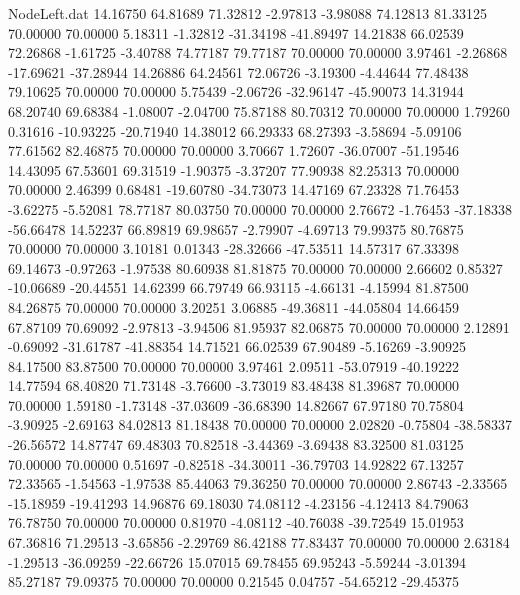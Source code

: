 \begin{filecontents}{NodeLeft.dat}
  14.16750   64.81689   71.32812    -2.97813   -3.98088   74.12813   81.33125   70.00000   70.00000    5.18311   -1.32812  -31.34198  -41.89497
  14.21838   66.02539   72.26868    -1.61725   -3.40788   74.77187   79.77187   70.00000   70.00000    3.97461   -2.26868  -17.69621  -37.28944
  14.26886   64.24561   72.06726    -3.19300   -4.44644   77.48438   79.10625   70.00000   70.00000    5.75439   -2.06726  -32.96147  -45.90073
  14.31944   68.20740   69.68384    -1.08007   -2.04700   75.87188   80.70312   70.00000   70.00000    1.79260    0.31616  -10.93225  -20.71940
  14.38012   66.29333   68.27393    -3.58694   -5.09106   77.61562   82.46875   70.00000   70.00000    3.70667    1.72607  -36.07007  -51.19546
  14.43095   67.53601   69.31519    -1.90375   -3.37207   77.90938   82.25313   70.00000   70.00000    2.46399    0.68481  -19.60780  -34.73073
  14.47169   67.23328   71.76453    -3.62275   -5.52081   78.77187   80.03750   70.00000   70.00000    2.76672   -1.76453  -37.18338  -56.66478
  14.52237   66.89819   69.98657    -2.79907   -4.69713   79.99375   80.76875   70.00000   70.00000    3.10181    0.01343  -28.32666  -47.53511
  14.57317   67.33398   69.14673    -0.97263   -1.97538   80.60938   81.81875   70.00000   70.00000    2.66602    0.85327  -10.06689  -20.44551
  14.62399   66.79749   66.93115    -4.66131   -4.15994   81.87500   84.26875   70.00000   70.00000    3.20251    3.06885  -49.36811  -44.05804
  14.66459   67.87109   70.69092    -2.97813   -3.94506   81.95937   82.06875   70.00000   70.00000    2.12891   -0.69092  -31.61787  -41.88354
  14.71521   66.02539   67.90489    -5.16269   -3.90925   84.17500   83.87500   70.00000   70.00000    3.97461    2.09511  -53.07919  -40.19222
  14.77594   68.40820   71.73148    -3.76600   -3.73019   83.48438   81.39687   70.00000   70.00000    1.59180   -1.73148  -37.03609  -36.68390
  14.82667   67.97180   70.75804    -3.90925   -2.69163   84.02813   81.18438   70.00000   70.00000    2.02820   -0.75804  -38.58337  -26.56572
  14.87747   69.48303   70.82518    -3.44369   -3.69438   83.32500   81.03125   70.00000   70.00000    0.51697   -0.82518  -34.30011  -36.79703
  14.92822   67.13257   72.33565    -1.54563   -1.97538   85.44063   79.36250   70.00000   70.00000    2.86743   -2.33565  -15.18959  -19.41293
  14.96876   69.18030   74.08112    -4.23156   -4.12413   84.79063   76.78750   70.00000   70.00000    0.81970   -4.08112  -40.76038  -39.72549
  15.01953   67.36816   71.29513    -3.65856   -2.29769   86.42188   77.83437   70.00000   70.00000    2.63184   -1.29513  -36.09259  -22.66726
  15.07015   69.78455   69.95243    -5.59244   -3.01394   85.27187   79.09375   70.00000   70.00000    0.21545    0.04757  -54.65212  -29.45375

\end{filecontents}
